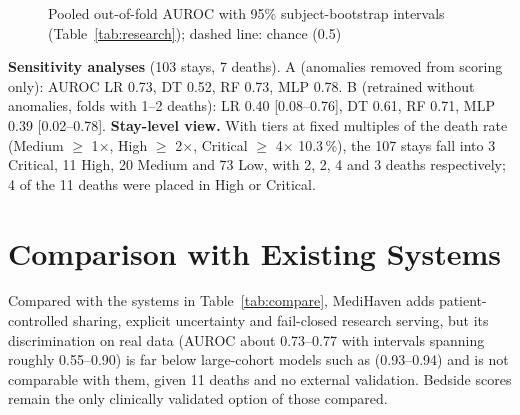 \begin{figure}[!htbp]
\centering
{}
\caption{Pooled out-of-fold AUROC with 95\% subject-bootstrap intervals (Table~\ref{tab:research});
dashed line: chance (0.5)}
\label{fig:auroc}
\end{figure}

\textbf{Sensitivity analyses} (103 stays, 7 deaths). A (anomalies removed from scoring only): AUROC
LR 0.73, DT 0.52, RF 0.73, MLP 0.78. B (retrained without anomalies, folds with 1--2 deaths): LR 0.40
[0.08--0.76], DT 0.61, RF 0.71, MLP 0.39 [0.02--0.78]. \textbf{Stay-level view.} With tiers at fixed
multiples of the death rate (Medium $\ge$ 1$\times$, High $\ge$ 2$\times$, Critical $\ge$ 4$\times$
10.3\,\%), the 107 stays fall into 3 Critical, 11 High, 20 Medium and 73 Low, with 2, 2, 4 and 3 deaths
respectively; 4 of the 11 deaths were placed in High or Critical.

\section{Comparison with Existing Systems}
Compared with the systems in Table~\ref{tab:compare}, MediHaven adds patient-controlled sharing, explicit
uncertainty and fail-closed research serving, but its discrimination on real data (AUROC about 0.73--0.77
with intervals spanning roughly 0.55--0.90) is far below large-cohort models such as
\cite{rajkomar2018scalable} (0.93--0.94) and is not comparable with them, given 11 deaths and no external
validation. Bedside scores remain the only clinically validated option of those compared.


